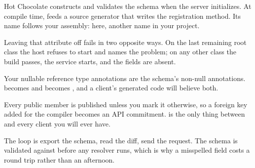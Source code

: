 \begin{chaptersummary}
  \item Hot Chocolate constructs and validates the schema when the server
        initializes. At compile time, \code{[QueryType]} feeds a source
        generator that writes the registration method. Its name follows your
        assembly:  here, another name in your project.
  \item Leaving that attribute off fails in two opposite ways. On the last
        remaining root class the host refuses to start and names the problem;
        on any other class the build passes, the service starts, and the
        fields are absent.
  \item Your nullable reference type annotations are the schema's non-null
        annotations.  becomes  and 
        becomes , and a client's generated code will believe both.
  \item Every public member is published unless you mark it otherwise, so a
        foreign key added for the compiler becomes an API commitment.
        \code{[GraphQLIgnore]} is the only thing between  and
        every client you will ever have.
  \item The loop is export the schema, read the diff, send the request. The
        schema is validated against before any resolver runs, which is why a
        misspelled field costs a round trip rather than an afternoon.
\end{chaptersummary}
